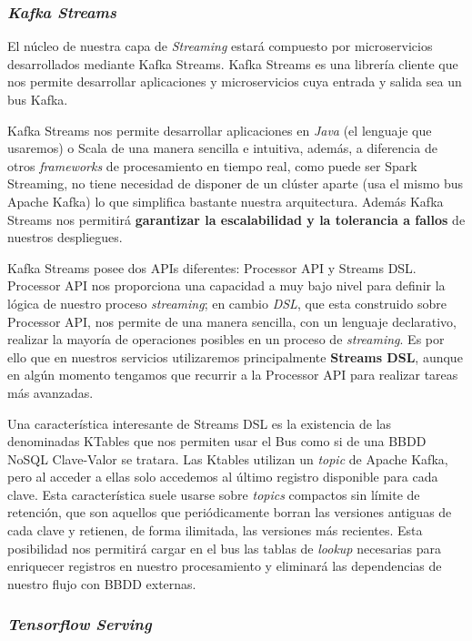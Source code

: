 \subsubsection{\textit{Kafka Streams}}

El núcleo de nuestra capa de \textit{Streaming} estará compuesto por microservicios desarrollados mediante 
 Kafka Streams. Kafka Streams \cite{kstreams} es una librería cliente que nos permite desarrollar aplicaciones y microservicios  cuya entrada y salida sea un bus Kafka. 
 
 Kafka Streams nos permite desarrollar aplicaciones en \textit{Java} (el lenguaje que usaremos) o Scala de una manera sencilla e intuitiva, además, a diferencia de otros \textit{frameworks} de procesamiento en tiempo real, como puede ser Spark Streaming, no tiene necesidad de disponer de un clúster aparte (usa el mismo bus Apache Kafka) lo que simplifica bastante nuestra arquitectura. Además Kafka Streams nos permitirá \textbf{garantizar la escalabilidad y la tolerancia a fallos} de nuestros despliegues. 
 
 Kafka Streams posee dos APIs diferentes: Processor API y  Streams DSL.  Processor API nos proporciona una capacidad a muy bajo nivel para definir la lógica de nuestro proceso \textit{streaming}; en cambio \textit{DSL}, que esta construido sobre  Processor API, nos permite de una manera sencilla, con un lenguaje declarativo, realizar la mayoría de operaciones posibles en un proceso de \textit{streaming}. Es por ello que en nuestros servicios utilizaremos principalmente \textbf{Streams DSL}, aunque en algún momento tengamos que recurrir a la Processor API para realizar tareas más avanzadas.
 
Una característica interesante de Streams DSL es la existencia de las denominadas KTables que nos permiten usar el Bus como si de una BBDD NoSQL Clave-Valor se tratara. Las Ktables utilizan un \textit{topic} de Apache Kafka, pero al acceder a ellas solo accedemos al último registro disponible para cada clave. Esta característica suele usarse sobre \textit{topics} compactos sin límite de retención, que son aquellos que periódicamente  borran las versiones antiguas de cada clave y retienen, de forma ilimitada, las versiones más recientes. Esta posibilidad nos permitirá cargar en el bus las tablas de \textit{lookup} necesarias para enriquecer registros en nuestro procesamiento y eliminará las dependencias de nuestro flujo con BBDD externas. 


 
 
\subsubsection{\textit{Tensorflow Serving}}

